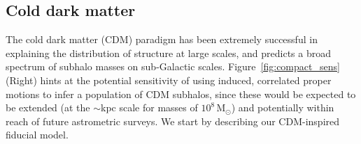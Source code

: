 \documentclass[prd,aps,10pt,nofootinbib,twocolumn,superscriptaddress,preprintnumbers,balancelastpage,longbibliography]{revtex4-1}
\begin{document}

\subsection{Cold dark matter}
\label{sec:cdmpop}

The cold dark matter (CDM) paradigm has been extremely successful in explaining the distribution of structure at large scales, and predicts a broad spectrum of subhalo masses on sub-Galactic scales. Figure~\ref{fig:compact_sens} (Right) hints at the potential sensitivity of using induced, correlated proper motions to infer a population of CDM subhalos, since these would be expected to be extended (at the $\sim$kpc scale for masses of $10^8\,\mathrm{M}_\odot$) and potentially within reach of future astrometric surveys. We start by describing our CDM-inspired fiducial model.
\end{document}
